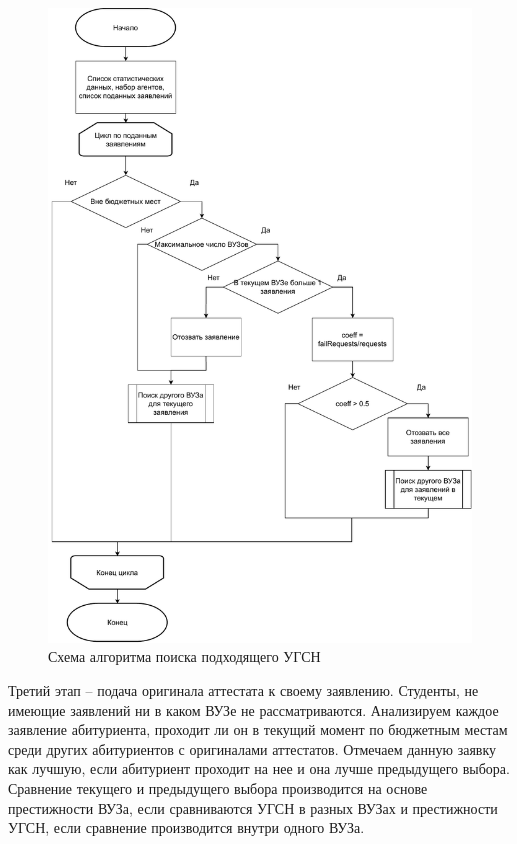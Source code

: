 \begin{figure}[hbtp]
	\centering
	\includegraphics[scale=0.6]{idef0/find.pdf}
	\caption{Схема алгоритма поиска подходящего УГСН}
	\label{scheme:find}
\end{figure}


Третий этап – подача оригинала аттестата к своему заявлению. Студенты, не имеющие заявлений ни в каком ВУЗе не рассматриваются. Анализируем каждое заявление абитуриента, проходит ли он в текущий момент по бюджетным местам среди других абитуриентов с оригиналами аттестатов. Отмечаем данную заявку как лучшую, если абитуриент проходит на нее и она лучше предыдущего выбора. Сравнение текущего и предыдущего выбора производится на основе престижности ВУЗа, если сравниваются УГСН в разных ВУЗах и престижности УГСН, если сравнение производится внутри одного ВУЗа.

